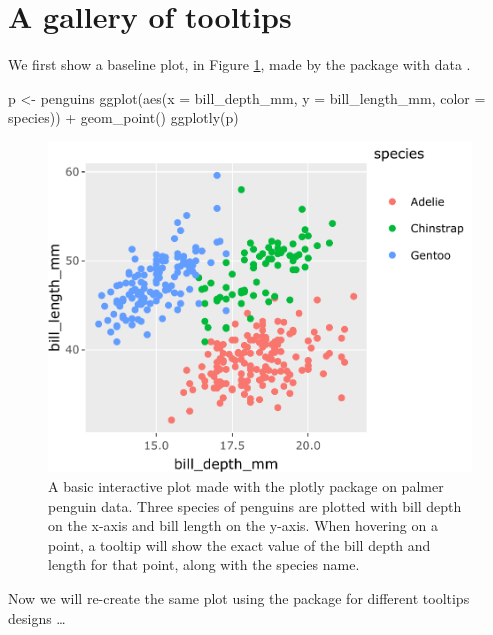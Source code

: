 \hypertarget{a-gallery-of-tooltips}{%
\section{A gallery of tooltips}\label{a-gallery-of-tooltips}}

We first show a baseline plot, in Figure \ref{fig:penguins-plotly}, made
by the  package with  data
\citep{palmerpenguins}.

\begin{Schunk}
\begin{Sinput}
p <- penguins %
  ggplot(aes(x = bill_depth_mm, y = bill_length_mm, 
             color = species)) + 
  geom_point()
ggplotly(p)
\end{Sinput}
\begin{figure}
\includegraphics{paper-with-errors_files/figure-latex/penguins-plotly-1} \caption[A basic interactive plot made with the plotly package on palmer penguin data]{A basic interactive plot made with the plotly package on palmer penguin data. Three species of penguins are plotted with bill depth on the x-axis and bill length on the y-axis. When hovering on a point, a tooltip will show the exact value of the bill depth and length for that point, along with the species name.}\label{fig:penguins-plotly}
\end{figure}
\end{Schunk}

Now we will re-create the same plot using the  package
for different tooltips designs \ldots{}

